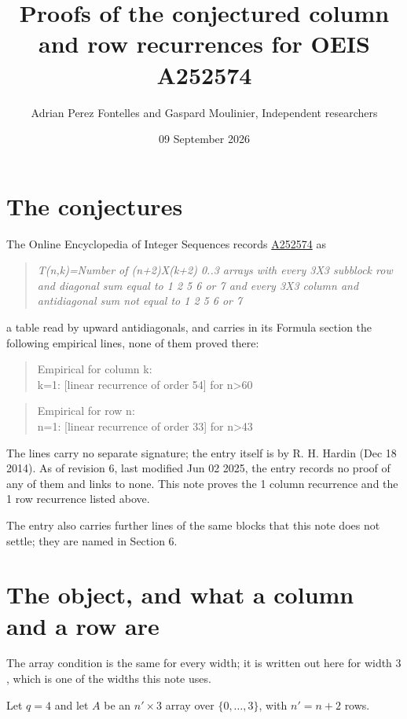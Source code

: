 \documentclass[11pt]{article}
\title{Proofs of the conjectured column and row recurrences for OEIS A252574}
\author{Adrian Perez Fontelles and Gaspard Moulinier, Independent researchers}
\date{09 September 2026}
\theoremstyle{definition}
\begin{document}
\maketitle
\section{The conjectures}

The Online Encyclopedia of Integer Sequences records \href{https://oeis.org/A252574}{A252574} as

\begin{quote}\itshape T(n,k)=Number of (n+2)X(k+2) 0..3 arrays with every 3X3 subblock row and diagonal sum equal to 1 2 5 6 or 7 and every 3X3 column and antidiagonal sum not equal to 1 2 5 6 or 7\end{quote}

a table read by upward antidiagonals, and carries in its Formula section the following empirical lines, none of them proved there:

\begin{quote}\ttfamily Empirical for column k:\\
k=1: [linear recurrence of order 54] for n>60\end{quote}

\begin{quote}\ttfamily Empirical for row n:\\
n=1: [linear recurrence of order 33] for n>43\end{quote}

The lines carry no separate signature; the entry itself is by R. H. Hardin (Dec 18 2014). As of revision 6, last modified Jun 02 2025, the entry records no proof of any of them and links to none. This note proves the 1 column recurrence and the 1 row recurrence listed above.

The entry also carries further lines of the same blocks that this note does not settle; they are named in Section 6.

\section{The object, and what a column and a row are}

The array condition is the same for every width; it is written out here for width $3$, which is one of the widths this note uses.

Let $q = 4$ and let $A$ be an $n' \times 3$ array over $\{0,\dots,3\}$, with $n' = n + 2$ rows.
\end{document}
